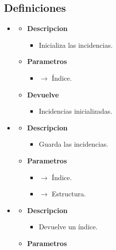 \subsection{Definiciones}
\begin{itemize}
	\item {}
	\begin{itemize}
		\item \textbf{Descripcion}
        \begin{itemize}
			\item Inicializa las incidencias.
		\end{itemize}
        \item \textbf{Parametros}
		\begin{itemize}
			\item {} $\rightarrow$ Índice.
		\end{itemize}
		\item \textbf{Devuelve}
		\begin{itemize}
			\item Incidencias inicializadas.
		\end{itemize}
	\end{itemize}
    \newpage
	\item{}
	\begin{itemize}
		\item \textbf{Descripcion}
        \begin{itemize}
			\item Guarda las incidencias.
		\end{itemize}
        \item \textbf{Parametros}
		\begin{itemize}
			\item {} $\rightarrow$ Índice.
            \item {} $\rightarrow$ Estructura.
		\end{itemize}
	\end{itemize}
    \item{}
	\begin{itemize}
		\item \textbf{Descripcion}
        \begin{itemize}
			\item Devuelve un índice.
		\end{itemize}
        \item \textbf{Parametros}
		\begin{itemize}

\end{itemize}
\end{itemize}
\end{itemize}
